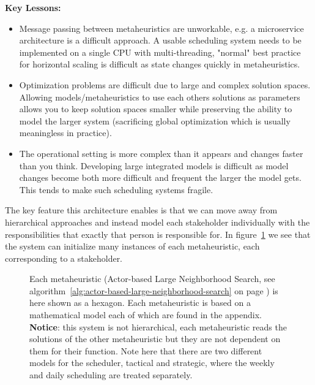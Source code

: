 \textbf{Key Lessons:}
\begin{itemize}[leftmargin=*, labelsep=0.5em]
	\item Message passing between metaheuristics are unworkable, e.g. a microservice
		architecture is a difficult approach. A usable scheduling system needs to
		be implemented on a single CPU with multi-threading, "normal" best practice for
		horizontal scaling is difficult as state changes quickly in metaheuristics. 
	\item Optimization problems are difficult due to large and complex solution
		spaces. Allowing models/metaheuristics to use each others solutions as
		parameters allows you to keep solution spaces smaller while preserving the
		ability to model the larger system (sacrificing global optimization which
		is usually meaningless in practice). 	
	\item The operational setting is more
		complex than it appears and changes faster than you think. Developing large
		integrated models is difficult as model changes become both more difficult
		and frequent the larger the model gets. This tends to make such scheduling
		systems fragile.
\end{itemize}

The key feature this architecture enables is that we can move away from hierarchical approaches and 
instead model each stakeholder individually with the responsibilities that exactly that person is responsible 
for. In figure~\ref{fig:model-setup:hexagon} we see that the system can initialize many instances of each metaheuristic, each corresponding to a stakeholder. 

\begin{figure}[H]
	
	\centering
	\drawModelSetupHexagon
	\caption{
		Each metaheuristic (Actor-based Large Neighborhood Search, see algorithm~\ref{alg:actor-based-large-neighborhood-search} on page \pageref{alg:actor-based-large-neighborhood-search}) is here shown as a hexagon.
		Each metaheuristic is based on a mathematical model each of which are found in the appendix. \textbf{Notice}: this system is not 
		hierarchical, each metaheuristic reads the solutions of the other metaheuristic but they are not dependent on them for their 
		function. Note here that there are two different models for the scheduler, tactical and strategic, where the weekly and daily scheduling are treated separately.
	}
	\label{fig:model-setup:hexagon}
\end{figure}

